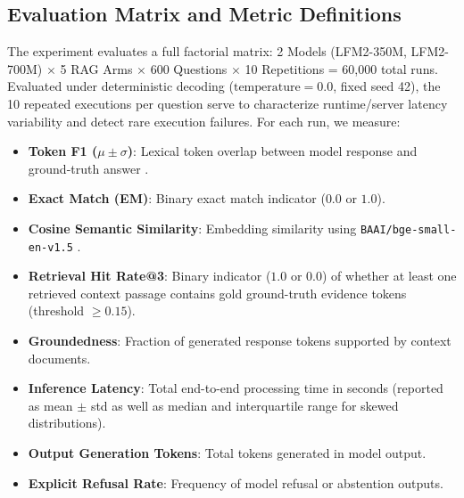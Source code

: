 \documentclass[conference]{IEEEtran}
\begin{document}
\subsection{Evaluation Matrix and Metric Definitions}
The experiment evaluates a full factorial matrix: 2 Models (LFM2-350M, LFM2-700M) $\times$ 5 RAG Arms $\times$ 600 Questions $\times$ 10 Repetitions = 60,000 total runs. Evaluated under deterministic decoding ($\text{temperature}=0.0$, fixed seed 42), the 10 repeated executions per question serve to characterize runtime/server latency variability and detect rare execution failures. For each run, we measure:
\begin{itemize}
    \item \textbf{Token F1 ($\mu \pm \sigma$)}: Lexical token overlap between model response and ground-truth answer \cite{rajpurkar2016squad}.
    \item \textbf{Exact Match (EM)}: Binary exact match indicator ($0.0$ or $1.0$).
    \item \textbf{Cosine Semantic Similarity}: Embedding similarity using \texttt{BAAI/bge-small-en-v1.5} \cite{reimers2019sentence, bge2023embedding}.
    \item \textbf{Retrieval Hit Rate@3}: Binary indicator ($1.0$ or $0.0$) of whether at least one retrieved context passage contains gold ground-truth evidence tokens (threshold $\ge 0.15$).
    \item \textbf{Groundedness}: Fraction of generated response tokens supported by context documents.
    \item \textbf{Inference Latency}: Total end-to-end processing time in seconds (reported as mean $\pm$ std as well as median and interquartile range for skewed distributions).
    \item \textbf{Output Generation Tokens}: Total tokens generated in model output.
    \item \textbf{Explicit Refusal Rate}: Frequency of model refusal or abstention outputs.
\end{itemize}
\end{document}
